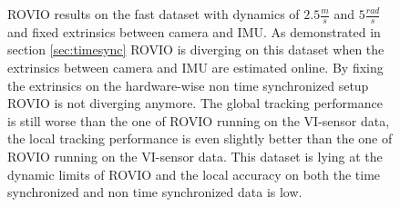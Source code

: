 \begin{figure}[h]
\begin{subfigure}[b]{0.42\textwidth}
    \caption{}
  \end{subfigure}
   \caption{ROVIO results on the fast dataset with dynamics of $2.5\frac{m}{s}$ and $5\frac{rad}{s}$ and fixed extrinsics between camera and IMU. As demonstrated in section \ref{sec:timesync} ROVIO is diverging on this dataset when the extrinsics between camera and IMU are estimated online. By fixing the extrinsics on the hardware-wise non time synchronized setup ROVIO is not diverging anymore. The global tracking performance is still worse than the one of ROVIO running on the VI-sensor data, the local tracking performance is even slightly better than the one of ROVIO running on the VI-sensor data. This dataset is lying at the dynamic limits of ROVIO and the local accuracy on both the time synchronized and non time synchronized data is low.}
   \label{pics:appendix_fast}
\end{figure}